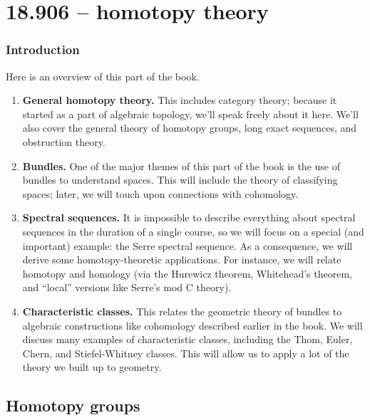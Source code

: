 \documentclass[10pt,a5paper]{memoir}
\begin{document}
\part{18.906 -- homotopy theory}\label{906}

\section*{Introduction}
Here is an overview of this part of the book.
\begin{enumerate}
    \item \textbf{General homotopy theory.} This includes category theory;
	because it started as a part of algebraic topology, we'll speak freely
	about it here.  We'll also cover the general theory of homotopy groups,
	long exact sequences, and obstruction theory.
    \item \textbf{Bundles.} One of the major themes of this part of the book is
	the use of bundles to understand spaces.  This will include the theory
	of classifying spaces; later, we will touch upon connections with
	cohomology.
    \item \textbf{Spectral sequences.} It is impossible to describe everything
	about spectral sequences in the duration of a single course, so we will
	focus on a special (and important) example: the Serre spectral
	sequence.  As a consequence, we will derive some homotopy-theoretic
	applications.  For instance, we will relate homotopy and homology (via
	the Hurewicz theorem, Whitehead's theorem, and ``local'' versions like
	Serre's mod C theory).
    \item \textbf{Characteristic classes.} This relates the geometric theory of
	bundles to algebraic constructions like cohomology described earlier in
	the book.  We will discuss many examples of characteristic classes,
	including the Thom, Euler, Chern, and Stiefel-Whitney classes.  This
	will allow us to apply a lot of the theory we built up to geometry.
\end{enumerate}

\chapter{Homotopy groups}













\end{document}
